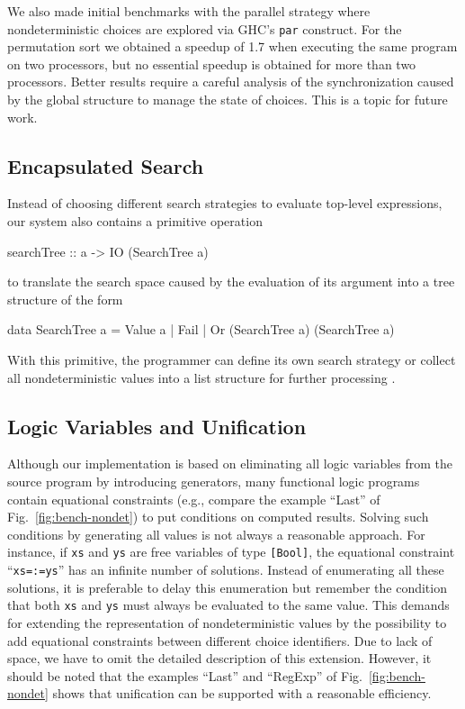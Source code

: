 \documentclass{llncs}
\newcommand{\code}[1]{\mbox{\small\texttt{#1}}}
\newcommand{\ccode}[1]{``\code{#1}''}
\begin{document}
We also made initial benchmarks with the parallel strategy
where nondeterministic choices are explored via GHC's \code{par}
construct. For the permutation sort we obtained a speedup of 1.7
when executing the same program on two processors, but no essential
speedup is obtained for more than two processors.
Better results require a careful analysis of the synchronization
caused by the global structure to manage the state of choices.
This is a topic for future work.

\subsection{Encapsulated Search}

Instead of choosing different search strategies to evaluate
top-level expressions, our system also contains a primitive operation
\begin{curry}
 searchTree :: a -> IO (SearchTree a)
\end{curry}
to translate the search space caused by the evaluation of its argument
into a tree structure of the form
\begin{curry}
 data SearchTree a = Value a | Fail | Or (SearchTree a) (SearchTree a)
\end{curry}
With this primitive,
the programmer can define its own search strategy or
collect all nondeterministic values into a list structure
for further processing \cite{BrasselHuch07}.


\subsection{Logic Variables and Unification}
\label{sec:unification}

Although our implementation is based on eliminating all logic
variables from the source program by introducing generators,
many functional logic programs contain equational constraints
(e.g., compare the example ``Last'' of Fig.~\ref{fig:bench-nondet})
to put conditions on computed results.
Solving such conditions by generating all values is not always
a reasonable approach. For instance, if \code{xs} and \code{ys}
are free variables of type \code{[Bool]}, the equational
constraint \ccode{xs=:=ys} has an infinite number of solutions.
Instead of enumerating all these solutions, it is preferable to
delay this enumeration but remember the condition that both
\code{xs} and \code{ys} must always be evaluated to the same value.
This demands for extending the representation of nondeterministic
values by the possibility to add equational constraints between
different choice identifiers.
Due to lack of space, we have to omit the detailed description
of this extension.
However, it should be noted that the examples
``Last'' and ``RegExp'' of Fig.~\ref{fig:bench-nondet}
shows that unification can be supported with a reasonable efficiency.
\end{document}

